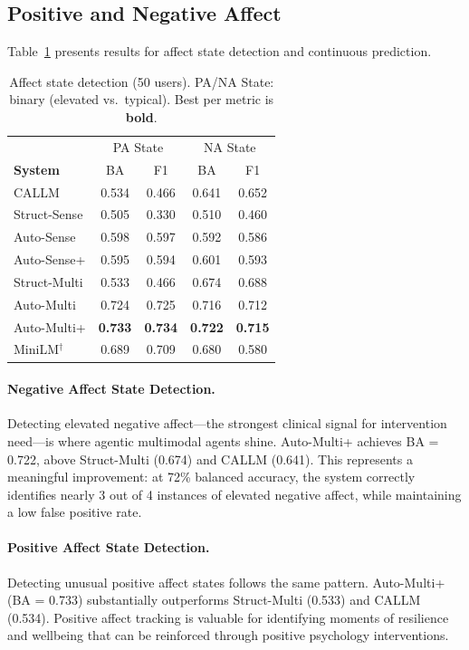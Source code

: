 \documentclass[screen,review,anonymous]{acmart}
\begin{document}
\subsection{Positive and Negative Affect}
\label{sec:results_affect}

Table~\ref{tab:affect} presents results for affect state detection and continuous prediction.

\begin{table}[t]
\caption{Affect state detection (50 users). PA/NA State: binary (elevated vs.\ typical). Best per metric is \textbf{bold}.}
\label{tab:affect}
\small
\begin{tabular}{l cc cc}
\toprule
& \multicolumn{2}{c}{PA State} & \multicolumn{2}{c}{NA State} \\
\textbf{System} & BA & F1 & BA & F1 \\
\midrule
CALLM & 0.534 & 0.466 & 0.641 & 0.652 \\
Struct-Sense & 0.505 & 0.330 & 0.510 & 0.460 \\
Auto-Sense & 0.598 & 0.597 & 0.592 & 0.586 \\
Auto-Sense+ & 0.595 & 0.594 & 0.601 & 0.593 \\
Struct-Multi & 0.533 & 0.466 & 0.674 & 0.688 \\
Auto-Multi & 0.724 & 0.725 & 0.716 & 0.712 \\
Auto-Multi+ & \textbf{0.733} & \textbf{0.734} & \textbf{0.722} & \textbf{0.715} \\
\midrule
MiniLM$^\dagger$ & 0.689 & 0.709 & 0.680 & 0.580 \\
\bottomrule
\end{tabular}
\end{table}

\paragraph{Negative Affect State Detection.}
Detecting elevated negative affect---the strongest clinical signal for intervention need---is where agentic multimodal agents shine. Auto-Multi+ achieves BA = 0.722, above Struct-Multi (0.674) and CALLM (0.641). This represents a meaningful improvement: at 72\% balanced accuracy, the system correctly identifies nearly 3 out of 4 instances of elevated negative affect, while maintaining a low false positive rate.

\paragraph{Positive Affect State Detection.}
Detecting unusual positive affect states follows the same pattern. Auto-Multi+ (BA = 0.733) substantially outperforms Struct-Multi (0.533) and CALLM (0.534). Positive affect tracking is valuable for identifying moments of resilience and wellbeing that can be reinforced through positive psychology interventions.
\end{document}
